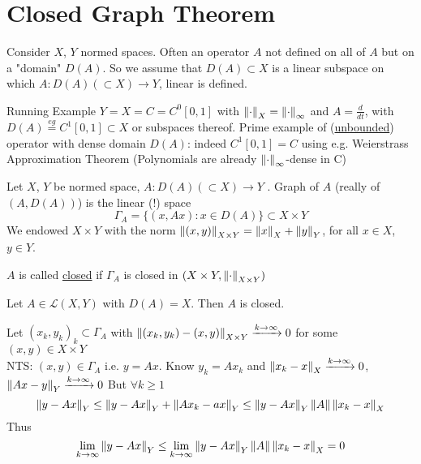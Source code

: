 \documentclass{article}
\begin{document}
\section{Closed Graph Theorem}
Consider $X$, $Y$ normed spaces. Often an operator $A$ not defined on all of $A$ but on a "domain" $D(A)$. So we assume that 
$D(A)\subset X$ is a linear subspace on which $A:D(A)(\subset X)\to Y$, linear is defined.
\begin{example}{Running Example}\nl
$Y=X=C=C^0[0,1]$ with $\left\|{\cdot}\right\|_X=\left\|{\cdot}\right\|_\infty$ and $A=\frac{d}{dt}$, with $D(A)\stackrel{eg}{=}C^1[0,1]\subset X$ or subspaces thereof. Prime example of  (\underline{unbounded}) operator with dense domain $D(A)$: indeed $C^1[0,1]=C$ using e.g. Weierstrass Approximation Theorem (Polynomials are already $\left\|{\cdot}\right\|_\infty$-dense in C)
\end{example}
\begin{definition}[Graph]\nl
Let $X$, $Y$ be normed space, $A:D(A)(\subset X)\to Y$ . Graph of $A$ (really  of $(A,D(A))$) is the linear (!) space 
$$
\Gamma_A=\{(x,Ax):x\in D(A)\}\subset X\times Y
$$
We endowed $X\times Y$ with the norm $\left\|{(x,y)}\right\|_{X\times Y}=\left\|{x}\right\|_X+\left\|{y}\right\|_Y$, for all $x\in X$, $y\in Y$.
    
\end{definition}
\begin{definition}
$A$ is called \underline{closed} if $\Gamma_A$ is closed in  $(X\times Y,\left\|{\cdot}\right\|_{X\times Y})$
\end{definition}

\begin{example}
Let $A\in\mathcal{L}(X,Y)$ with $D(A)=X$. Then $A$ is closed.
\begin{pf}{}{}
	Let $(x_k,y_k)_k\subset \Gamma_A$  with $\left\|{(x_k,y_k)-(x,y)}\right\|_{X\times Y}\xrightarrow{k\to\infty}0$ for some $(x,y)\in X\times Y$\\
	NTS: $(x,y)\in \Gamma_A$ i.e. $y=Ax$. 
	Know $ y_k=Ax_k$ and $\left\|{x_k-x}\right\|_X\xrightarrow{k\to\infty}0$, $\left\|{Ax-y}\right\|_Y\xrightarrow{k\to\infty}0$
	But $\forall k\geq 1$
	$$\left\|{y-Ax}\right\|_Y\leq\left\|{y-Ax}\right\|_Y+\left\|{Ax_k-ax}\right\|_Y
	\leq \left\|{y-Ax}\right\|_Y\left\|{A}\right\|\left\|{x_k-x}\right\|_X$$
	Thus 
	$$\lim_{k\to\infty}\left\|{y-Ax}\right\|_Y\leq\lim_{k\to\infty}\left\|{y-Ax}\right\|_Y\left\|{A}\right\|\left\|{x_k-x}\right\|_X=0$$
\end{pf}
\end{example}
\end{document}
